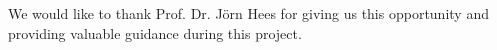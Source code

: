 

    {
        We would like to thank Prof. Dr. Jörn Hees for giving us this opportunity and providing valuable guidance during this project.
    }

